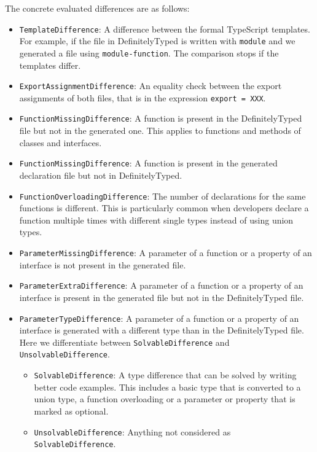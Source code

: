 \documentclass[english,cleveref,autoref,submission]{programming}
\begin{document}
The concrete evaluated differences are as follows:
\begin{itemize}
  \item \texttt{TemplateDifference}: A difference between the formal TypeScript templates. For example, if the file in DefinitelyTyped is written with \texttt{module} and we generated a file using \texttt{module-function}. The comparison stops if the templates differ.
  \item \texttt{ExportAssignmentDifference}: An equality check between the export assignments of both files, that is in the expression \lstinline{export = XXX}.
  \item \texttt{FunctionMissingDifference}: A function is present in the DefinitelyTyped file but not in the generated one. This applies to functions and methods of classes and interfaces.
  \item \texttt{FunctionMissingDifference}: A function is present in the generated declaration file but not in DefinitelyTyped.
  \item \texttt{FunctionOverloadingDifference}: The number of declarations for the same functions is different. This is particularly common when developers declare a function multiple times with different single types instead of using union types.
  \item \texttt{ParameterMissingDifference}: A parameter of a function or a property of an interface is not present in the generated file.
  \item \texttt{ParameterExtraDifference}: A parameter of a function or a property of an interface is present in the generated file but not in the DefinitelyTyped file.
  \item \texttt{ParameterTypeDifference}: A parameter of a function or a property of an interface is generated with a different type than in the DefinitelyTyped file. Here we differentiate between \texttt{SolvableDifference} and \texttt{UnsolvableDifference}.
  \begin{itemize}
    \item \texttt{SolvableDifference}: A type difference that can be solved by writing better code examples. This includes a basic type that is converted to a union type, a function overloading or a parameter or property that is marked as optional.
    \item \texttt{UnsolvableDifference}: Anything not considered as \texttt{SolvableDifference}.
  \end{itemize}
\end{itemize}
\end{document}
